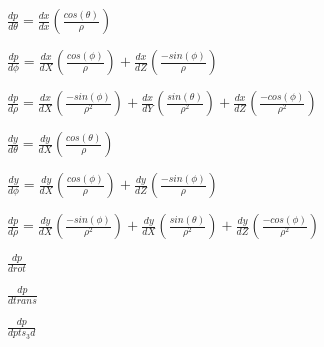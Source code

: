 \documentclass{article}
\begin{document}
$ \frac{dp}{d\theta}= \frac{dx}{dx}(\frac{cos(\theta)}{\rho})$
\pagebreak

$ \frac{dp}{d\phi}= \frac{dx}{dX} (\frac{cos(\phi)}{\rho}) + \frac{dx}{dZ} (\frac{-sin(\phi)}{\rho})$
\pagebreak

$ \frac{dp}{d\rho}=\frac{dx}{dX} (\frac{-sin(\phi)}{\rho^2}) + \frac{dx}{dY} (\frac{sin(\theta)}{\rho^2}) + \frac{dx}{dZ} (\frac{-cos(\phi)}{\rho^2}) $
\pagebreak

$ \frac{dy}{d\theta}= \frac{dy}{dX}(\frac{cos(\theta)}{\rho})$
\pagebreak

$ \frac{dy}{d\phi}=\frac{dy}{dX}(\frac{cos(\phi)}{\rho}) + \frac{dy}{dZ}(\frac{-sin(\phi)}{\rho}) $
\pagebreak

$ \frac{dp}{d\rho}=\frac{dy}{dX} (\frac{-sin(\phi)}{\rho^2}) + \frac{dy}{dX} (\frac{sin(\theta)}{\rho^2}) + \frac{dy}{dZ} (\frac{-cos(\phi)}{\rho^2}) $
\pagebreak

$\frac{dp}{drot}$
\pagebreak

$\frac{dp}{dtrans}$
\pagebreak

$\frac{dp}{dpts_3d}$
\pagebreak
\end{document}
